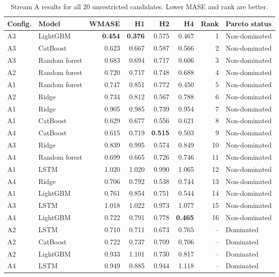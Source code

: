 \documentclass[preprint,12pt]{elsarticle}
\begin{document}
\begin{table}[H]
\centering
\caption{Stream A results for all 20 unrestricted candidates. Lower MASE and rank are better.}
\label{tab:streamA}
\scriptsize
\setlength{\tabcolsep}{4pt}
\renewcommand{\arraystretch}{0.85}
\begin{adjustbox}{max width=\textwidth}
\begin{tabular}{@{}llrrrrrl@{}}
\toprule
Config. & Model & WMASE & H1 & H2 & H4 & Rank & Pareto status \\
\midrule
A3 & LightGBM & \textbf{0.454} & \textbf{0.376} & 0.575 & 0.467 & 1 & Non-dominated \\
A3 & CatBoost & 0.623 & 0.667 & 0.587 & 0.566 & 2 & Non-dominated \\
A3 & Random forest & 0.683 & 0.694 & 0.717 & 0.606 & 3 & Non-dominated \\
A2 & Random forest & 0.720 & 0.717 & 0.748 & 0.688 & 4 & Non-dominated \\
A1 & Random forest & 0.747 & 0.851 & 0.772 & 0.450 & 5 & Non-dominated \\
A2 & Ridge & 0.734 & 0.812 & 0.567 & 0.788 & 6 & Non-dominated \\
A1 & Ridge & 0.905 & 0.985 & 0.739 & 0.954 & 7 & Non-dominated \\
A1 & CatBoost & 0.629 & 0.677 & 0.556 & 0.621 & 8 & Non-dominated \\
A4 & CatBoost & 0.615 & 0.719 & \textbf{0.515} & 0.503 & 9 & Non-dominated \\
A3 & Ridge & 0.839 & 0.995 & 0.574 & 0.849 & 10 & Non-dominated \\
A4 & Random forest & 0.699 & 0.665 & 0.726 & 0.746 & 11 & Non-dominated \\
A1 & LSTM & 1.020 & 1.020 & 0.990 & 1.065 & 12 & Non-dominated \\
A4 & Ridge & 0.706 & 0.792 & 0.538 & 0.744 & 13 & Non-dominated \\
A1 & LightGBM & 0.761 & 0.854 & 0.751 & 0.544 & 14 & Non-dominated \\
A3 & LSTM & 1.018 & 1.022 & 0.973 & 1.077 & 15 & Non-dominated \\
A4 & LightGBM & 0.722 & 0.791 & 0.778 & \textbf{0.465} & 16 & Non-dominated \\
A2 & LSTM & 0.710 & 0.711 & 0.673 & 0.765 & -- & Dominated \\
A2 & CatBoost & 0.722 & 0.737 & 0.709 & 0.706 & -- & Dominated \\
A2 & LightGBM & 0.933 & 1.101 & 0.730 & 0.817 & -- & Dominated \\
A4 & LSTM & 0.949 & 0.885 & 0.944 & 1.118 & -- & Dominated \\
\bottomrule
\end{tabular}
\end{adjustbox}
\end{table}
\end{document}
